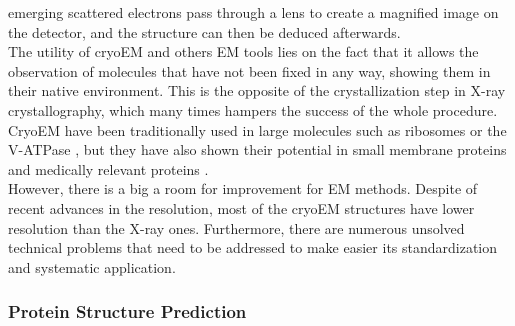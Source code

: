 \documentclass[11pt, b5paper,twoside]{tesi_upf}
\begin{document}
\begin{enumerate}[label=(\alph*)]
emerging scattered electrons pass through a lens to create a magnified image on the detector, and the structure can then be deduced afterwards. \\
The utility of cryoEM and others EM tools lies on the fact that it allows the observation of molecules that have not been fixed in any way, showing them in their native environment. This is the opposite of the crystallization step in X-ray crystallography, which many times hampers the success of the whole procedure. CryoEM have been traditionally used in large molecules such as ribosomes \cite{Khatter2015} or the V-ATPase \cite{Zhao2015}, but they have also shown their potential in small membrane proteins \cite{Liao2013} and medically relevant proteins \cite{Bai2015}. \\ 
However, there is a big a room for improvement for EM methods. Despite of recent advances in the resolution, most of the cryoEM structures have lower resolution than the X-ray ones. Furthermore, there are numerous unsolved technical  problems that need to be addressed to make easier its standardization and systematic application.
\end{enumerate}
 



\subsubsection{Protein Structure Prediction} \label{structure_predicion}
\end{document}
